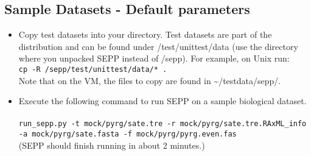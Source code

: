 \documentclass[11pt]{article} %
\newcommand{\sepp}{SEPP\xspace}
\newcommand{\ins}[1]{{\tt #1}}
\newcommand{\file}[1]{{\sf #1}}
\newcommand{\sepphome} {\file{{\raise.17ex\hbox{$\scriptstyle\sim$}}/sepp}\xspace}
\begin{document}
\subsection{Sample Datasets - Default parameters}
\begin{itemize}
\item Copy test datasets into your directory. Test datasets are part of the distribution and can be found under \file{\sepphome/test/unittest/data} (use the directory where you unpacked \sepp instead of \sepphome).
For example, on Unix run:\\ \ins{cp -R \sepphome/test/unittest/data/*  .}\\
Note that on the VM, the files to copy are found in \textasciitilde/testdata/sepp/. 



\item Execute the following command to run \sepp on a sample biological dataset.\\
\\
\ins{run\_sepp.py -t mock/pyrg/sate.tre -r mock/pyrg/sate.tre.RAxML\_info -a mock/pyrg/sate.fasta -f mock/pyrg/pyrg.even.fas} \\

(\sepp should finish running in about 2 minutes.) 
\end{itemize}
\end{document}
